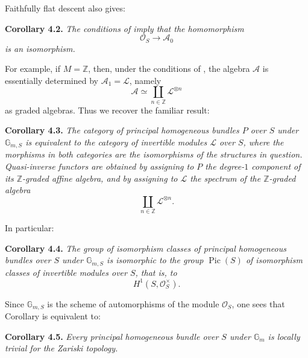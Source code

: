 Faithfully flat descent also gives:

\medskip
\noindent{}\textbf{Corollary 4.2.}
\textit{The conditions of 
imply that the homomorphism}
\[
  \mathcal O_S\longrightarrow\mathscr A_0
\]
\textit{is an isomorphism.}

For example, if \(M=\mathbb Z\), then, under the conditions of
, the algebra \(\mathscr A\)
is essentially determined by \(\mathscr A_1=\mathscr L\), namely
\[
  \mathscr A\simeq\coprod_{n\in\mathbb Z}\mathscr L^{\otimes n}
\]
as graded algebras. Thus we recover the familiar result:

\medskip
\noindent{}\textbf{Corollary 4.3.}
\textit{The category of principal homogeneous bundles \(P\) over \(S\)
under \(\mathbb G_{m,S}\) is equivalent to the category of invertible
modules \(\mathscr L\) over \(S\), where the morphisms in both categories
are the isomorphisms of the structures in question. Quasi-inverse
functors are obtained by assigning to \(P\) the degree-\(1\) component of
its \(\mathbb Z\)-graded affine algebra, and by assigning to
\(\mathscr L\) the spectrum of the \(\mathbb Z\)-graded algebra}
\[
  \coprod_{n\in\mathbb Z}\mathscr L^{\otimes n}.
\]

In particular:

\medskip
\noindent{}\textbf{Corollary 4.4.}
\textit{The group of isomorphism classes of principal homogeneous
bundles over \(S\) under \(\mathbb G_{m,S}\) is isomorphic to the group
\(\operatorname{Pic}(S)\) of isomorphism classes of invertible modules
over \(S\), that is, to}
\[
  H^1(S,\mathcal O_S^\times).
\]

Since \(\mathbb G_{m,S}\) is the scheme of automorphisms of the module
\(\mathcal O_S\), one sees that Corollary  is
equivalent to:

\medskip
\noindent{}\textbf{Corollary 4.5.}
\textit{Every principal homogeneous bundle over \(S\) under
\(\mathbb G_m\) is locally trivial for the Zariski topology.}

